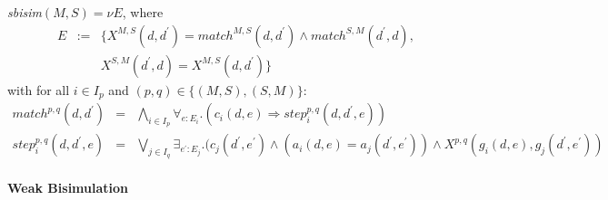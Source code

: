 \documentclass{article}
\begin{document}
\emph{sbisim}$(M,S)=\nu E$, where%
\begin{equation*}
\begin{array}{ccl}
E & := & \{X^{M,S}(d,d^{\prime })=match^{M,S}(d,d^{\prime })\wedge
match^{S,M}(d^{\prime },d), \\ 
&  & X^{S,M}(d^{\prime },d)=X^{M,S}(d,d^{\prime })\}%
\end{array}%
\end{equation*}%
with for all $i\in I_{p}$ and $(p,q)\in \{(M,S),(S,M)\}$:%
\begin{eqnarray*}
match^{p,q}(d,d^{\prime }) &=&\bigwedge\limits_{i\in I_{p}}\forall
_{e:E_{i}}.(c_{i}(d,e)\Rightarrow step_{i}^{p,q}(d,d^{\prime },e)) \\
step_{i}^{p,q}(d,d^{\prime },e) &=&\bigvee\limits_{j\in I_{q}}\exists
_{e^{\prime }:E_{j}}.(c_{j}(d^{\prime },e^{\prime })\wedge
(a_{i}(d,e)=a_{j}(d^{\prime },e^{\prime }))\wedge
X^{p,q}(g_{i}(d,e),g_{j}(d^{\prime },e^{\prime }))
\end{eqnarray*}

\paragraph{Weak Bisimulation}
\end{document}
